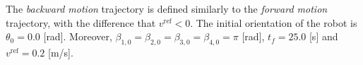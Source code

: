 The \textit{backward motion} trajectory is defined similarly to the \textit{forward motion} trajectory, with the difference that $v^{\mathrm{ref}}<0$. The initial orientation of the robot is $\theta_0=0.0$ [rad]. Moreover, $\beta_{1,0}=\beta_{2,0}=\beta_{3,0}=\beta_{4,0}=\pi$ [rad], $t_f = 25.0$ [s] and $v^{\mathrm{ref}}=0.2$ [m/s]. %

